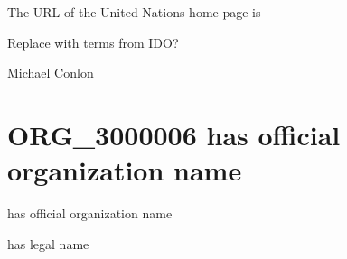 \documentclass[letterpaper,10pt,english]{sphinxmanual}
\begin{document}
\begin{sphinxShadowBox}

\sphinxAtStartPar
{}
\end{sphinxShadowBox}

\begin{sphinxShadowBox}

\sphinxAtStartPar
The URL of the United Nations home page is 
\end{sphinxShadowBox}

\begin{sphinxShadowBox}

\sphinxAtStartPar
Replace with terms from IDO?
\end{sphinxShadowBox}

\begin{sphinxShadowBox}

\sphinxAtStartPar
Michael Conlon 
\end{sphinxShadowBox}
\begin{quote}

\ignorespaces \end{quote}


\section{ORG\_3000006 \sphinxhyphen{} has official organization name}
\label{\detokenize{doc-ORG_3000006:org-3000006-has-official-organization-name}}\label{\detokenize{doc-ORG_3000006:index-0}}\label{\detokenize{doc-ORG_3000006::doc}}
\begin{sphinxShadowBox}

\sphinxAtStartPar
has official organization name
\end{sphinxShadowBox}

\begin{sphinxShadowBox}

\sphinxAtStartPar
has legal name
\end{sphinxShadowBox}
\end{document}
